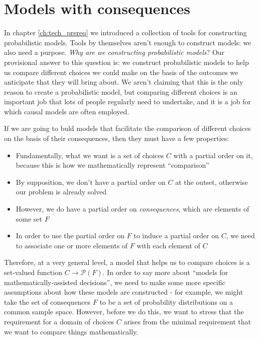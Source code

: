 

\chapter{Models with consequences}\label{ch:2p_statmodels}

In chapter \ref{ch:tech_prereq} we introduced a collection of tools for constructing probabilistic models. Tools by themselves aren't enough to construct models: we also need a purpose. \emph{Why are we constructing probabilistic models}? Our provisional answer to this question is: we construct probabilistic models to help us compare different choices we could make on the basis of the outcomes we anticipate that they will bring about. We aren't claiming that this is the only reason to create a probabilistic model, but comparing different choices is an important job that lots of people regularly need to undertake, and it is a job for which causal models are often employed.

If we are going to buld models that facilitate the comparison of different choices on the basis of their consequences, then they must have a few properties:

\begin{itemize}
    \item Fundamentally, what we want is a set of choices $C$ with a partial order on it, because this is how we mathematically represent ``comparison''
    \item By supposition, we don't have a partial order on $C$ at the outset, otherwise our problem is already solved
    \item However, we do have a partial order on \emph{consequences}, which are elements of some set $F$
    \item In order to use the partial order on $F$ to induce a partial order on $C$, we need to associate one or more elements of $F$ with each element of $C$
\end{itemize}

Therefore, at a very general level, a model that helps us to compare choices is a set-valued function $C\to \mathscr{P}(F)$. In order to say more about ``models for mathematically-assisted decisions'', we need to make some more specific assumptions about how these models are constructed - for example, we might take the set of consequences $F$ to be a set of probability distributions on a common sample space. However, before we do this, we want to stress that the requirement for a domain of choices $C$ arises from the minimal requirement that we want to compare things mathematically.

